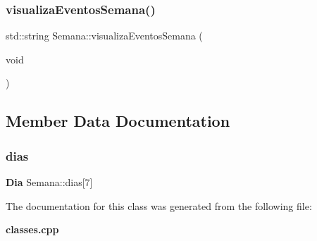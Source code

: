 \subsubsection{visualiza\+Eventos\+Semana()}
{\footnotesize\ttfamily std\+::string Semana\+::visualiza\+Eventos\+Semana (\begin{DoxyParamCaption}\item[{void}]{ }\end{DoxyParamCaption})\hspace{0.3cm}{\ttfamily [inline]}}



\subsection{Member Data Documentation}
\mbox{\label{class_semana_a08a2be1b7d2935938aa936c404a37837}} 
\subsubsection{dias}
{\footnotesize\ttfamily \textbf{ Dia} Semana\+::dias[7]}



The documentation for this class was generated from the following file\+:\begin{DoxyCompactItemize}
\item 
\textbf{ classes.\+cpp}\end{DoxyCompactItemize}
